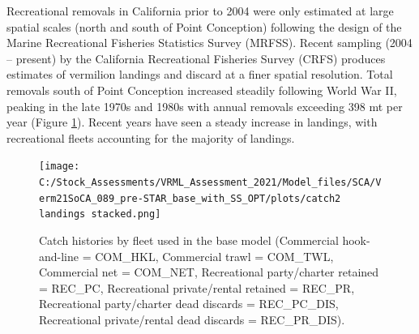 \documentclass[11pt,
  english,
  a4paper,
]{article}
\begin{document}
Recreational removals in California prior to 2004 were only estimated at large spatial scales (north and south of Point Conception) following the design of the Marine Recreational Fisheries Statistics Survey (MRFSS). Recent sampling (2004 -- present) by the California Recreational Fisheries Survey (CRFS) produces estimates of vermilion landings and discard at a finer spatial resolution. Total removals south of Point Conception increased steadily following World War II, peaking in the late 1970s and 1980s with annual removals exceeding 398 mt per year (Figure \ref{fig:catch}). Recent years have seen a steady increase in landings, with recreational fleets accounting for the majority of landings.

\FloatBarrier

\begin{figure}
\centering
\texttt{[image: C:/Stock\_Assessments/VRML\_Assessment\_2021/Model\_files/SCA/Verm21SoCA\_089\_pre-STAR\_base\_with\_SS\_OPT/plots/catch2 landings stacked.png]}
\caption{Catch histories by fleet used in the base model (Commercial hook-and-line = COM\_HKL, Commercial trawl = COM\_TWL, Commercial net = COM\_NET, Recreational party/charter retained = REC\_PC, Recreational private/rental retained = REC\_PR, Recreational party/charter dead discards = REC\_PC\_DIS, Recreational private/rental dead discards = REC\_PR\_DIS).\label{fig:catch}}
\end{figure}
\end{document}
